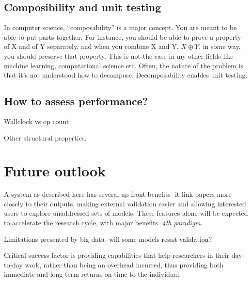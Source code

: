 \documentclass[conference]{IEEEtran}
\begin{document}
\subsection{Composibility and unit testing}
In computer science, ``composability'' is a major concept. You are
meant to be able to put parts together. For instance, you should be
able to prove a property of X and of Y separately, and when you
combine X and Y, $X \oplus Y$, in some way, you should preserve that
property.  This is not the case in my other fields like machine
learning, computational science etc. Often, the nature of the problem
is that it's not understood how to decompose. Decomposability 
enables unit testing. 



\subsection{How to assess performance?}
Wallclock vs op count

Other structural properties. 

\section{Future outlook}

A system as described here has several up front benefits- it link papers 
more closely to their outputs, making external validation easier and 
allowing interested users to explore unaddressed sets of models. These 
features alone will be expected to accelerate the research cycle, with
major benefits. \emph{4th paradigm}.

Limitations presented by big data- will some models resist validation?

Critical success factor is providing capabilities that help researchers 
in their day-to-day work, rather than being an overhead incurred, thus 
providing both immediate and long-term returns on time to the individual.





\end{document}
